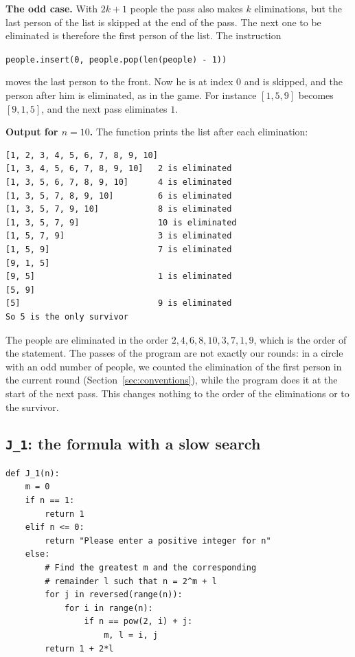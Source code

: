 \textbf{The odd case.} With $2k+1$ people the pass also makes $k$
eliminations, but the last person of the list is skipped at the end of the
pass. The next one to be eliminated is therefore the first person of the list.
The instruction
\begin{center}
\texttt{people.insert(0, people.pop(len(people) - 1))}
\end{center}
moves the last person to the front. Now he is at index $0$ and is skipped, and
the person after him is eliminated, as in the game. For instance
$[1,5,9]$ becomes $[9,1,5]$, and the next pass eliminates $1$.

\textbf{Output for $n=10$.} The function prints the list after each
elimination:
\begin{lstlisting}[numbers=none, caption={Output of \texttt{J\_0(10)}.}]
[1, 2, 3, 4, 5, 6, 7, 8, 9, 10]
[1, 3, 4, 5, 6, 7, 8, 9, 10]   2 is eliminated
[1, 3, 5, 6, 7, 8, 9, 10]      4 is eliminated
[1, 3, 5, 7, 8, 9, 10]         6 is eliminated
[1, 3, 5, 7, 9, 10]            8 is eliminated
[1, 3, 5, 7, 9]                10 is eliminated
[1, 5, 7, 9]                   3 is eliminated
[1, 5, 9]                      7 is eliminated
[9, 1, 5]
[9, 5]                         1 is eliminated
[5, 9]
[5]                            9 is eliminated
So 5 is the only survivor
\end{lstlisting}
The people are eliminated in the order $2,4,6,8,10,3,7,1,9$, which is the order
of the statement. The passes of the program are not exactly our rounds: in a
circle with an odd number of people, we counted the elimination of the first
person in the current round (Section~\ref{sec:conventions}), while the program
does it at the start of the next pass. This changes nothing to the order of
the eliminations or to the survivor.

\subsection{\texorpdfstring{\texttt{J\_1}: the formula with a slow search}{J\_1: the formula with a slow search}}

\begin{lstlisting}[language=iPython, caption={The function \texttt{J\_1}, which uses the formula $J(n)=2\ell+1$.}]
def J_1(n):
    m = 0
    if n == 1:
        return 1
    elif n <= 0:
        return "Please enter a positive integer for n"
    else:
        # Find the greatest m and the corresponding
        # remainder l such that n = 2^m + l
        for j in reversed(range(n)):
            for i in range(n):
                if n == pow(2, i) + j:
                    m, l = i, j
        return 1 + 2*l
\end{lstlisting}

